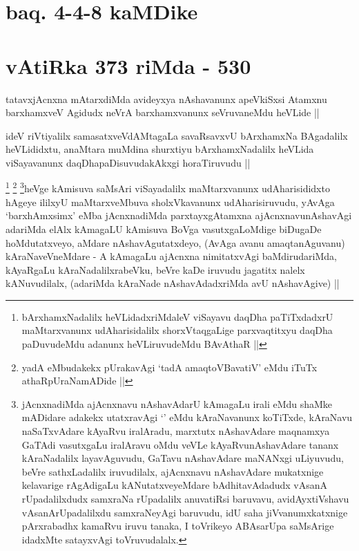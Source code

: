
\section*{baq. 4-4-8 kaMDike}

\section*{vAtiRka 373 riMda - 530}

\begin{artha}
tatavxjAcnxna mAtarxdiMda avideyxya nAshavanunx apeVkiSxsi Atamxnu
barxhamxveV Agidudx neVrA barxhamxvanunx seVruvaneMdu heVLide ||
\end{artha}

\begin{artha}
ideV riVtiyalilx samasatxveVdAMtagaLa savaRsavxvU bArxhamxNa
BAgadalilx heVLididxtu, anaMtara muMdina shurxtiyu bArxhamxNadalilx
heVLida viSayavanunx daqDhapaDisuvudakAkxgi horaTiruvudu ||
\end{artha}

\begin{artha}
\footnote{bArxhamxNadalilx heVLidadxriMdaleV viSayavu daqDha
  paTiTxdadxrU maMtarxvanunx udAharisidalilx shorxVtaqgaLige
  parxvaqtitxyu daqDha paDuvudeMdu adanunx heVLiruvudeMdu BAvAthaR ||}
\footnote{yadA eMbudakekx pUrakavAgi `tadA amaqtoVBavatiV' eMdu iTuTx
  athaRpUraNamADide ||}
\footnote{jAcnxnadiMda ajAcnxnavu nAshavAdarU kAmagaLu irali eMdu
  shaMke mADidare adakekx utatxravAgi `\stext' eMdu kAraNavanunx
  koTiTxde, kAraNavu naSaTxvAdare kAyaRvu iralAradu, marxtutx
  nAshavAdare maqnamxya GaTAdi vasutxgaLu iralAravu oMdu veVLe
  kAyaRvunAshavAdare tananx kAraNadalilx layavAguvudu, GaTavu
  nAshavAdare maNANxgi uLiyuvudu, beVre sathxLadalilx iruvudilalx,
  ajAcnxnavu nAshavAdare mukatxnige kelavarige rAgAdigaLu
  kANutatxveyeMdare bAdhitavAdadudx vAsanA rUpadalilxdudx samxraNa
  rUpadalilx anuvatiRsi baruvavu, avidAyxtiVshavu vAsanArUpadalilxdu
  samxraNeyAgi baruvudu, idU saha jiVvanumxkatxnige pArxrabadhx
  kamaRvu iruvu tanaka, I toVrikeyo ABAsarUpa saMsArige idadxMte
  satayxvAgi toVruvudalalx.}heVge kAmisuva saMsAri viSayadalilx maMtarxvanunx udAharisididxto
hAgeye ililxyU maMtarxveMbuva sholxVkavanunx udAharisiruvudu, yAvAga
`barxhAmxsimx' eMba jAcnxnadiMda parxtayxgAtamxna ajAcnxnavunAshavAgi
adariMda elAlx kAmagaLU kAmisuva BoVga vasutxgaLoMdige biDugaDe
hoMdutatxveyo, aMdare nAshavAgutatxdeyo, (AvAga avanu amaqtanAguvanu)
kAraNaveVneMdare - A kAmagaLu ajAcnxna nimitatxvAgi baMdirudariMda,
kAyaRgaLu kAraNadalilxrabeVku, beVre kaDe iruvudu jagatitx nalelx
kANuvudilalx, (adariMda kAraNade nAshavAdadxriMda avU nAshavAgive) ||
\end{artha}

